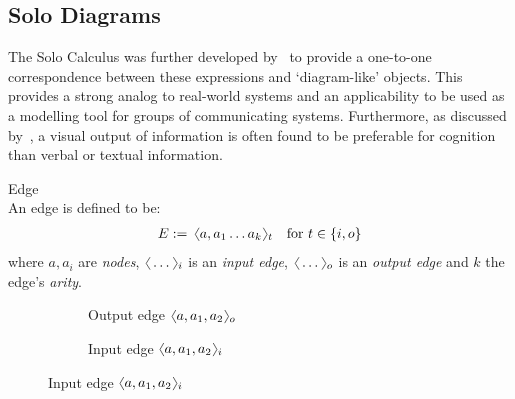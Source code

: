 \subsection{Solo Diagrams}\label{ssec:diagram-definitions}

    The Solo Calculus was further developed by~\cite{solo-diagrams} to provide a one-to-one correspondence between these  expressions and `diagram-like' objects.
    This provides a strong analog to real-world systems and an applicability to be used as a modelling tool for groups of communicating systems.
    Furthermore, as discussed by~\cite{learning-styles}, a visual output of information is often found to be preferable for cognition than verbal or textual information.\\

    \begin{definition}{Edge\\}
        An edge is defined to be:
        \begin{align*}
            E \defeq \, \langl a, a_1 \ldots a_k\rangl_t \quad \text{for } t \in \{ i, o \}
        \end{align*}
        where $a, a_i$ are \textit{nodes}, $\langl \ldots\rangl_i$ is an \textit{input edge}, $\langl\ldots\rangl_o$ is an \textit{output edge} and $k$ the edge's \textit{arity}.
    \end{definition}

    \begin{figure}[H]
        \centering
        \begin{subfigure}{0.4\linewidth}
            \centering
            \caption*{Output edge $\langl a, a_1, a_2\rangl_o$}
        \end{subfigure}
        \begin{subfigure}{0.4\linewidth}
            \centering
            \caption*{Input edge $\langl a, a_1, a_2\rangl_i$}
        \end{subfigure}
    \end{figure}

